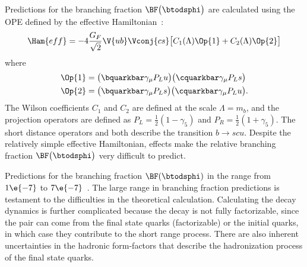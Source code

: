 Predictions for the branching fraction $\BF\big(\btodsphi\big)$ are calculated using the OPE defined
by the effective Hamiltonian~\cite{Zou:2009zza,Mohanta:2002wf,PhysRevD.76.057701,Lu:2001yz}:
\begin{equation}
  \Ham{eff}=
  -4\frac{G_F}{\sqrt{2}} \V{ub}\Vconj{cs}
  \big[
    C_1(\Lambda)\Op{1}+C_2(\Lambda)\Op{2}
    \big]
\end{equation}
where
\begin{align}
  \Op{1} &= \big(\bquarkbar\gamma_\mu P_Lu\big) \big(\cquarkbar\gamma_\mu P_Ls\big) \nonumber\\
  \Op{2} &= \big(\bquarkbar\gamma_\mu P_Ls\big) \big(\cquarkbar\gamma_\mu P_Lu\big).
\end{align}
The Wilson coefficients $C_1$ and $C_2$ are defined at the scale $\Lambda=m_b$,
and the projection operators are defined as $P_L=\tfrac12(1-\gamma_5)$ and
$P_R=\tfrac12(1+\gamma_5)$.
The short distance operators  and  both describe the transition $b\!\to scu$.
Despite the relatively simple effective Hamiltonian, \QCD effects make the relative branching
fraction $\BF\big(\btodsphi\big)$ very difficult to predict.

Predictions for the branching fraction $\BF(\btodsphi)$ in the \sm range from
\approx$1\e{-7}$ to
\approx$7\e{-7}$~\cite{Zou:2009zza,Mohanta:2002wf,PhysRevD.76.057701,Lu:2001yz}.
The large range in branching fraction predictions is testament to the difficulties in the
theoretical calculation.
Calculating the decay dynamics is further complicated because the decay \btodsphi is not fully
factorizable, since the \ssbar pair can come from the final state quarks (factorizable) or the
initial quarks, in which case they contribute to the short range process.
There are also inherent uncertainties in the hadronic form-factors that describe the hadronization
process of the final state quarks.

